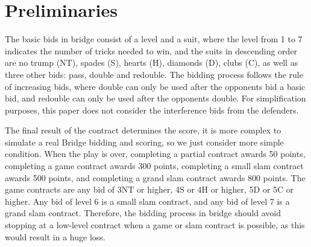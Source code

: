 \documentclass[11pt]{article}
\begin{document}
\section{Preliminaries}\label{sec:prelim}
The basic bids in bridge consist of a level and a suit, where the level from 1 to 7 indicates the number of tricks needed to win, and the suits in descending order are no trump (NT), spades (S), hearts (H), diamonds (D), clubs (C), as well as three other bids: pass, double and redouble. The bidding process follows the rule of increasing bids, where double can only be used after the opponents bid a basic bid, and redouble can only be used after the opponents double. For simplification purposes, this paper does not consider the interference bids from the defenders.

The final result of the contract determines the score, it is more complex to simulate a real Bridge bidding and scoring, so we just consider more simple condition. When the play is over, completing a partial contract awards 50 points, completing a game contract awards 300 points, completing a small slam contract awards 500 points, and completing a grand slam contract awards 800 points. The game contracts are any bid of 3NT or higher, 4S or 4H or higher, 5D or 5C or higher. Any bid of level 6 is a small slam contract, and any bid of level 7 is a grand slam contract. Therefore, the bidding process in bridge should avoid stopping at a low-level contract when a game or slam contract is possible, as this would result in a huge loss.

\end{document}

